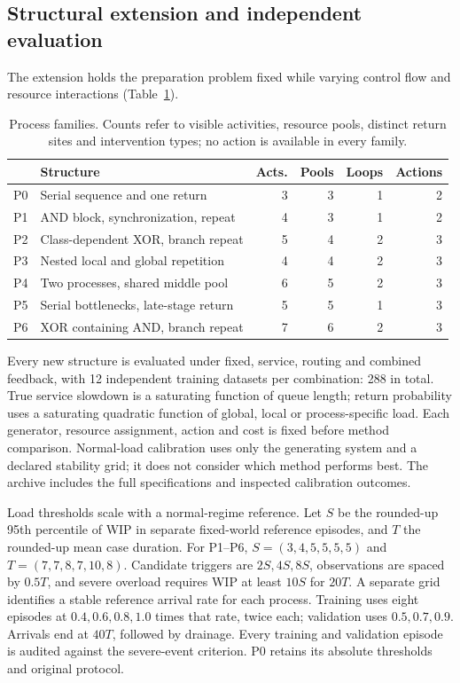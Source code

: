\subsection{Structural extension and independent evaluation}
The extension holds the preparation problem fixed while varying control flow and resource interactions (Table~\ref{tab:processes}).

\begin{table}[t]\caption{Process families. Counts refer to visible activities, resource pools, distinct return sites and intervention types; no action is available in every family.}\label{tab:processes}\centering\small\setlength{\tabcolsep}{4pt}
\begin{tabular}{lp{}rrrr}\toprule
 & Structure & Acts. & Pools & Loops & Actions\\\midrule
P0 & Serial sequence and one return & 3 & 3 & 1 & 2\\
P1 & AND block, synchronization, repeat & 4 & 3 & 1 & 2\\
P2 & Class-dependent XOR, branch repeat & 5 & 4 & 2 & 3\\
P3 & Nested local and global repetition & 4 & 4 & 2 & 3\\
P4 & Two processes, shared middle pool & 6 & 5 & 2 & 3\\
P5 & Serial bottlenecks, late-stage return & 5 & 5 & 1 & 3\\
P6 & XOR containing AND, branch repeat & 7 & 6 & 2 & 3\\
\bottomrule\end{tabular}\end{table}

Every new structure is evaluated under fixed, service, routing and combined feedback, with 12 independent training datasets per combination: 288 in total. True service slowdown is a saturating function of queue length; return probability uses a saturating quadratic function of global, local or process-specific load. Each generator, resource assignment, action and cost is fixed before method comparison. Normal-load calibration uses only the generating system and a declared stability grid; it does not consider which method performs best. The archive includes the full specifications and inspected calibration outcomes.

Load thresholds scale with a normal-regime reference. Let $S$ be the rounded-up 95th percentile of WIP in separate fixed-world reference episodes, and $T$ the rounded-up mean case duration. For P1--P6, $S=(3,4,5,5,5,5)$ and $T=(7,7,8,7,10,8)$. Candidate triggers are $2S,4S,8S$, observations are spaced by $0.5T$, and severe overload requires WIP at least $10S$ for $20T$. A separate grid identifies a stable reference arrival rate for each process. Training uses eight episodes at $0.4,0.6,0.8,1.0$ times that rate, twice each; validation uses $0.5,0.7,0.9$. Arrivals end at $40T$, followed by drainage. Every training and validation episode is audited against the severe-event criterion. P0 retains its absolute thresholds and original protocol.

